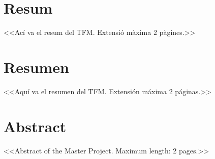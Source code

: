 

\chapter*{Resum}

<<Ací va el resum del TFM. Extensió màxima 2 pàgines.>>

\newpage

\chapter*{Resumen}

<<Aquí va el resumen del TFM. Extensión máxima 2 páginas.>>

\newpage


\chapter*{Abstract}

<<Abstract of the Master Project. Maximum length: 2 pages.>>


